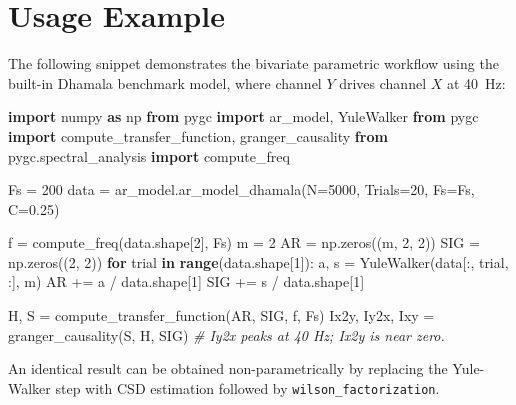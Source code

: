 \documentclass[10pt,a4paper,onecolumn]{article}
\newenvironment{Shaded}{}{}
\newcommand{\KeywordTok}[1]{\textcolor[rgb]{0.00,0.44,0.13}{\textbf{#1}}}
\newcommand{\NormalTok}[1]{#1}
\newcommand{\CommentTok}[1]{\textcolor[rgb]{0.38,0.63,0.69}{\textit{#1}}}
\newcommand{\BuiltInTok}[1]{\textcolor[rgb]{0.00,0.50,0.00}{\textbf{#1}}}
\newcommand{\ImportTok}[1]{\textcolor[rgb]{0.00,0.50,0.00}{\textbf{#1}}}
\newcommand{\DecValTok}[1]{\textcolor[rgb]{0.25,0.63,0.44}{#1}}
\newcommand{\OperatorTok}[1]{\textcolor[rgb]{0.40,0.40,0.40}{#1}}
\begin{document}
\section{Usage Example}\label{usage}

The following snippet demonstrates the bivariate parametric workflow
using the built-in Dhamala benchmark model, where channel \(Y\) drives
channel \(X\) at 40~Hz:

\begin{Shaded}
\begin{Highlighting}[]
\ImportTok{import} \NormalTok{numpy} \ImportTok{as} \NormalTok{np}
\ImportTok{from} \NormalTok{pygc} \ImportTok{import} \NormalTok{ar\_model, YuleWalker}
\ImportTok{from} \NormalTok{pygc} \ImportTok{import} \NormalTok{compute\_transfer\_function, granger\_causality}
\ImportTok{from} \NormalTok{pygc.spectral\_analysis} \ImportTok{import} \NormalTok{compute\_freq}

\NormalTok{Fs} \OperatorTok{=} \DecValTok{200}
\NormalTok{data} \OperatorTok{=} \NormalTok{ar\_model.ar\_model\_dhamala(N}\OperatorTok{=}\DecValTok{5000}\NormalTok{, Trials}\OperatorTok{=}\DecValTok{20}\NormalTok{, Fs}\OperatorTok{=}\NormalTok{Fs, C}\OperatorTok{=}\DecValTok{0}\NormalTok{.}\DecValTok{25}\NormalTok{)}

\NormalTok{f} \OperatorTok{=} \NormalTok{compute\_freq(data.shape[}\DecValTok{2}\NormalTok{], Fs)}
\NormalTok{m} \OperatorTok{=} \DecValTok{2}
\NormalTok{AR}  \OperatorTok{=} \NormalTok{np.zeros((m,} \DecValTok{2}\NormalTok{,} \DecValTok{2}\NormalTok{))}
\NormalTok{SIG} \OperatorTok{=} \NormalTok{np.zeros((}\DecValTok{2}\NormalTok{,} \DecValTok{2}\NormalTok{))}
\KeywordTok{for} \NormalTok{trial} \KeywordTok{in} \BuiltInTok{range}\NormalTok{(data.shape[}\DecValTok{1}\NormalTok{]):}
\NormalTok{    a, s} \OperatorTok{=} \NormalTok{YuleWalker(data[:, trial, :], m)}
\NormalTok{    AR}  \OperatorTok{+=} \NormalTok{a} \OperatorTok{/} \NormalTok{data.shape[}\DecValTok{1}\NormalTok{]}
\NormalTok{    SIG} \OperatorTok{+=} \NormalTok{s} \OperatorTok{/} \NormalTok{data.shape[}\DecValTok{1}\NormalTok{]}

\NormalTok{H, S}   \OperatorTok{=} \NormalTok{compute\_transfer\_function(AR, SIG, f, Fs)}
\NormalTok{Ix2y, Iy2x, Ixy} \OperatorTok{=} \NormalTok{granger\_causality(S, H, SIG)}
\CommentTok{\# Iy2x peaks at 40 Hz; Ix2y is near zero.}
\end{Highlighting}
\end{Shaded}

An identical result can be obtained non-parametrically by replacing the
Yule-Walker step with CSD estimation followed by
\texttt{wilson\_factorization}.
\end{document}
